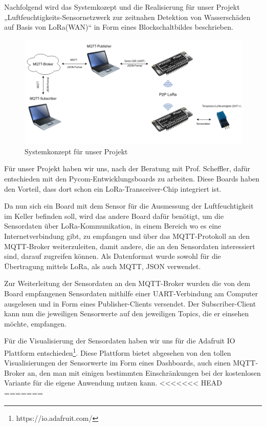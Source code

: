 Nachfolgend wird das Systemkozept und die Realisierung für unser Projekt „Luftfeuchtigkeits-Sensornetzwerk zur zeitnahen Detektion von Wasserschäden auf Basis von LoRa(WAN)“ in Form eines Blockschaltbildes beschrieben. 

\begin{figure}[h]
 \centering
 \includegraphics[width=1\textwidth]{pictures/Blockschaltbild_ProNeSy}
 \caption[Systemkonzept für unser Projekt]{Systemkonzept für unser Projekt}
 \label{fig:systemkonzept}
\end{figure}

Für unser Projekt haben wir uns, nach der Beratung mit Prof. Scheffler, dafür entschieden mit den Pycom-Entwicklungsboards zu arbeiten. Diese Boards haben den Vorteil, dass dort schon ein LoRa-Transceiver-Chip integriert ist. 

Da nun sich ein Board mit dem Sensor für die Ausmessung der Luftfeuchtigkeit im Keller befinden soll, wird das andere Board dafür benötigt, um die Sensordaten über LoRa-Kommunikation, in einem Bereich wo es eine Internetverbindung gibt, zu empfangen und über das MQTT-Protokoll an den MQTT-Broker weiterzuleiten, damit andere, die an den Sensordaten interessiert sind, darauf zugreifen können. Als Datenformat wurde sowohl für die Übertragung mittels LoRa, als auch MQTT, JSON verwendet.

Zur Weiterleitung der Sensordaten an den MQTT-Broker wurden die von dem Board empfangenen Sensordaten mithilfe einer UART-Verbindung am Computer ausgelesen und in Form eines Publisher-Clients versendet. Der Subscriber-Client kann nun die jeweiligen Sensorwerte auf den jeweiligen Topics, die er einsehen möchte, empfangen.

Für die Visualisierung der Sensordaten haben wir uns für die Adafruit IO Plattform entschieden\footnote{https://io.adafruit.com/}. Diese Plattform bietet abgesehen von den tollen Visualisierungen der Sensorwerte im Form eines Dashboards, auch einen MQTT-Broker an, den man mit einigen bestimmten Einschränkungen bei der kostenlosen Variante für die eigene Anwendung nutzen kann. 
<<<<<<< HEAD
=======
%
%
%
%

